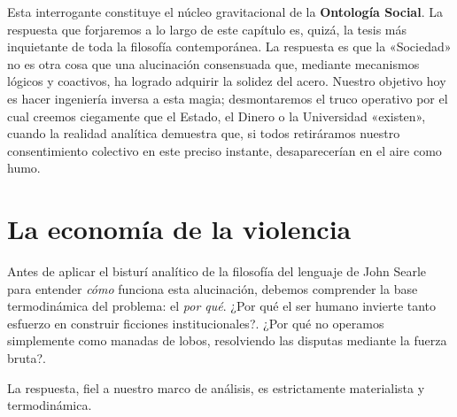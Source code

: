 Esta interrogante constituye el núcleo gravitacional de la \textbf{Ontología Social}. La respuesta que forjaremos a lo largo de este capítulo es, quizá, la tesis más inquietante de toda la filosofía contemporánea. La respuesta es que la «Sociedad» no es otra cosa que una alucinación consensuada que, mediante mecanismos lógicos y coactivos, ha logrado adquirir la solidez del acero. Nuestro objetivo hoy es hacer ingeniería inversa a esta magia; desmontaremos el truco operativo por el cual creemos ciegamente que el Estado, el Dinero o la Universidad «existen», cuando la realidad analítica demuestra que, si todos retiráramos nuestro consentimiento colectivo en este preciso instante, desaparecerían en el aire como humo.

\section{La economía de la violencia}

Antes de aplicar el bisturí analítico de la filosofía del lenguaje de John Searle para entender \textit{cómo} funciona esta alucinación, debemos comprender la base termodinámica del problema: el \textit{por qué}. ¿Por qué el ser humano invierte tanto esfuerzo en construir ficciones institucionales?. ¿Por qué no operamos simplemente como manadas de lobos, resolviendo las disputas mediante la fuerza bruta?. 

La respuesta, fiel a nuestro marco de análisis, es estrictamente materialista y termodinámica.

